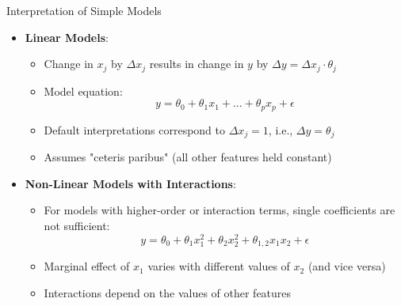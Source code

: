 \documentclass[10pt,compress,t,notes=noshow, xcolor=table]{beamer}
\begin{document}
\begin{frame}{Interpretation of Simple Models}
\begin{itemize}
\item \textbf{Linear Models}:
\begin{itemize}
\item Change in $x_j$ by $\Delta x_j$ results in change in $y$ by $\Delta y = \Delta x_j \cdot \theta_j$
\item Model equation:
\[
y = \theta_0 + \theta_1 x_1 + \dots + \theta_p x_p + \epsilon
\]
\item Default interpretations correspond to $\Delta x_j = 1$, i.e., $\Delta y = \theta_j$
\item Assumes "ceteris paribus" (all other features held constant)
\end{itemize}
\item \textbf{Non-Linear Models with Interactions}:
\begin{itemize}
\item For models with higher-order or interaction terms, single coefficients are not sufficient:
\[
y = \theta_0 + \theta_{1} x_1^2 + \theta_{2} x_2^2 + \theta_{1,2} x_1 x_2 + \epsilon
\]
\item Marginal effect of $x_1$ varies with different values of $x_2$ (and vice versa)
\item Interactions depend on the values of other features
\end{itemize}
\end{itemize}
\end{frame}

\end{document}

